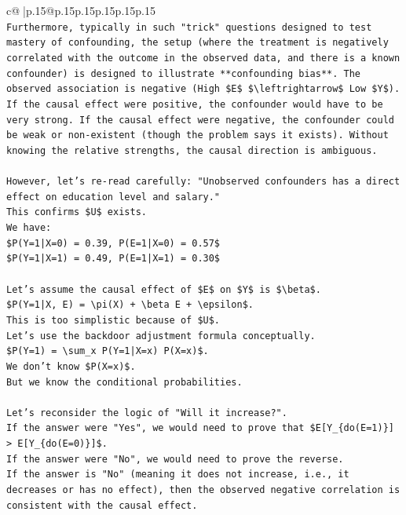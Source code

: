 \documentclass{article}
\begin{document}
{\begin{supertabular}{c@{$\;$}|p{.15\linewidth}@{}p{.15\linewidth}p{.15\linewidth}p{.15\linewidth}p{.15\linewidth}p{.15\linewidth}}
{{{\\ 
\texttt{Furthermore, typically in such "trick" questions designed to test mastery of confounding, the setup (where the treatment is negatively correlated with the outcome in the observed data, and there is a known confounder) is designed to illustrate **confounding bias**. The observed association is negative (High \$E\$ \$\textbackslash{}leftrightarrow\$ Low \$Y\$). If the causal effect were positive, the confounder would have to be very strong. If the causal effect were negative, the confounder could be weak or non{-}existent (though the problem says it exists). Without knowing the relative strengths, the causal direction is ambiguous.} \\
\\ 
\texttt{However, let's re{-}read carefully: "Unobserved confounders has a direct effect on education level and salary."} \\
\texttt{This confirms \$U\$ exists.} \\
\texttt{We have:} \\
\texttt{\$P(Y=1|X=0) = 0.39, P(E=1|X=0) = 0.57\$} \\
\texttt{\$P(Y=1|X=1) = 0.49, P(E=1|X=1) = 0.30\$} \\
\\ 
\texttt{Let's assume the causal effect of \$E\$ on \$Y\$ is \$\textbackslash{}beta\$.} \\
\texttt{\$P(Y=1|X, E) = \textbackslash{}pi(X) + \textbackslash{}beta E + \textbackslash{}epsilon\$.} \\
\texttt{This is too simplistic because of \$U\$.} \\
\texttt{Let's use the backdoor adjustment formula conceptually.} \\
\texttt{\$P(Y=1) = \textbackslash{}sum\_x P(Y=1|X=x) P(X=x)\$.} \\
\texttt{We don't know \$P(X=x)\$.} \\
\texttt{But we know the conditional probabilities.} \\
\\ 
\texttt{Let's reconsider the logic of "Will it increase?".} \\
\texttt{If the answer were "Yes", we would need to prove that \$E{[}Y\_\{do(E=1)\}{]} > E{[}Y\_\{do(E=0)\}{]}\$.} \\
\texttt{If the answer were "No", we would need to prove the reverse.} \\
\texttt{If the answer is "No" (meaning it does not increase, i.e., it decreases or has no effect), then the observed negative correlation is consistent with the causal effect.} \\
}}}
\end{supertabular}}
\end{document}
